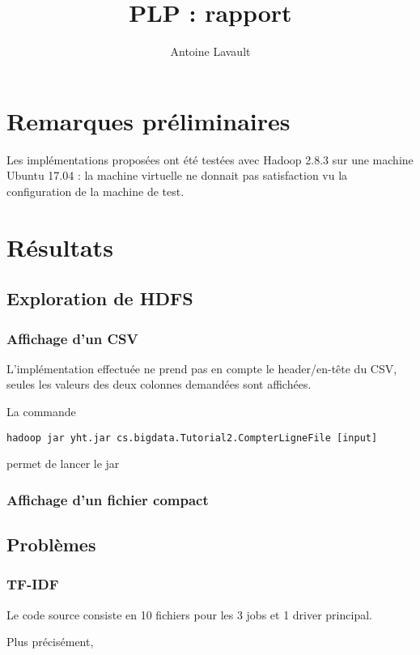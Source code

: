 \documentclass[french]{article}
\title{PLP : rapport}
\author{Antoine Lavault}
\begin{document}
\maketitle

\section*{Remarques préliminaires}

Les implémentations proposées ont été testées avec Hadoop 2.8.3 sur une machine Ubuntu 17.04 : la machine virtuelle ne donnait pas satisfaction vu la configuration de la machine de test.

\section{Résultats}
\subsection{Exploration de HDFS}
\subsubsection{Affichage d'un CSV}

L'implémentation effectuée ne prend pas en compte le header/en-tête du CSV, seules les valeurs des deux colonnes demandées sont affichées.

La commande
 \begin{verbatim}
hadoop jar yht.jar cs.bigdata.Tutorial2.CompterLigneFile [input] 
\end{verbatim} 

permet de lancer le jar

\subsubsection{Affichage d'un fichier compact}




\subsection{Problèmes}
\subsubsection{TF-IDF}

Le code source consiste en 10 fichiers pour les 3 jobs et 1 driver principal.

Plus précisément,
\end{document}

